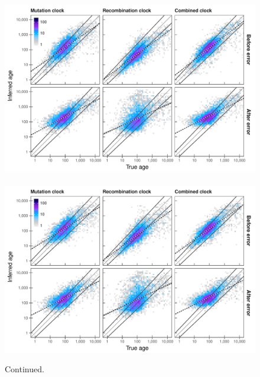 \begin{figure}[p]
\ContinuedFloat
{\,\small{}} \\
\includegraphics[width=\textwidth]{./img/ch5/generror_scat_fgtH}
{\,\small{}} \\
\includegraphics[width=\textwidth]{./img/ch5/generror_scat_fgtP}
\caption[]{Continued.}
\label{fig:generror_scat_fgt}
\end{figure}


